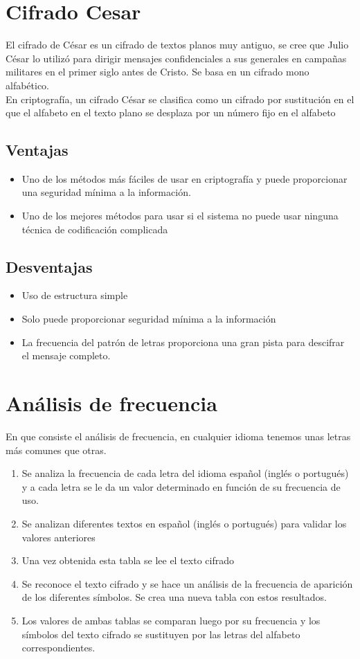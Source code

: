 \documentclass[journal,onecolumn]{IEEEtran}
\begin{document}
\section{Cifrado Cesar}
\noindent
El cifrado de César es un cifrado de textos planos muy
antiguo, se cree que Julio César lo utilizó para dirigir
mensajes confidenciales a sus generales en campañas
militares en el primer siglo antes de Cristo. Se basa en
un cifrado mono alfabético.\\
En criptografía, un cifrado César se clasifica como
un cifrado por sustitución en el que el alfabeto en el
texto plano se desplaza por un número fijo en el alfabeto
\subsection{Ventajas}
\begin{itemize}
    \item Uno de los métodos más fáciles de usar en
    criptografía y puede proporcionar una
    seguridad mínima a la información.
    \item Uno de los mejores métodos para usar
    si el sistema no puede usar ninguna técnica de
    codificación complicada
\end{itemize}

\subsection{Desventajas}
\begin{itemize}
    \item Uso de estructura simple
    \item Solo puede proporcionar seguridad mínima a la
    información
    \item La frecuencia del patrón de letras proporciona
    una gran pista para descifrar el mensaje
    completo.
\end{itemize}

\section{Análisis de frecuencia}
En que consiste el análisis de frecuencia, en cualquier
idioma tenemos unas letras más comunes que otras.
\begin{enumerate}
    \item Se analiza la frecuencia de cada letra del idioma
    español (inglés o portugués) y a cada letra se le da
    un valor determinado en función de su frecuencia
    de uso.
    \item Se analizan diferentes textos en español (inglés o
    portugués) para validar los valores anteriores 
    \item Una vez obtenida esta tabla se lee
    el texto cifrado  
    \item Se reconoce el texto cifrado y se hace un análisis
    de la frecuencia de aparición de los diferentes
    símbolos. Se crea una nueva tabla con estos
    resultados.
    \item Los valores de ambas tablas se comparan luego por
    su frecuencia y los símbolos del texto cifrado se
    sustituyen por las letras del alfabeto
    correspondientes.
\end{enumerate}
\end{document}
